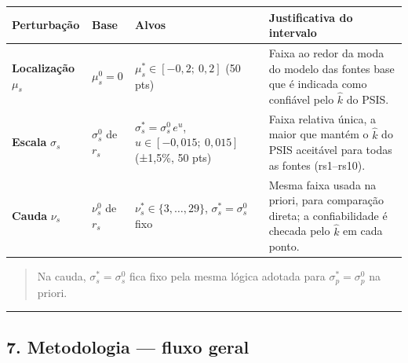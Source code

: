 \documentclass[11pt]{article}
\newcounter{none}
\begin{document}
{\def\LTcaptype{none} %
\begin{longtable}[]{@{}
  >{\raggedright\arraybackslash}p{}
  >{\raggedright\arraybackslash}p{}
  >{\raggedright\arraybackslash}p{}
  >{\raggedright\arraybackslash}p{}@{}}
\toprule\noalign{}
\begin{minipage}[b]{\linewidth}\raggedright
Perturbação
\end{minipage} & \begin{minipage}[b]{\linewidth}\raggedright
Base
\end{minipage} & \begin{minipage}[b]{\linewidth}\raggedright
Alvos
\end{minipage} & \begin{minipage}[b]{\linewidth}\raggedright
Justificativa do intervalo
\end{minipage} \\
\midrule\noalign{}
\endhead
\bottomrule\noalign{}
\endlastfoot
\textbf{Localização} \(\mu_s\) & \(\mu_s^{0} = 0\) &
\(\mu_s^{*} \in [-0{,}2;\ 0{,}2]\) (50 pts) & Faixa ao redor da moda do
modelo das fontes base que é indicada como confiável pelo \(\hat k\) do
PSIS. \\
\textbf{Escala} \(\sigma_s\) & \(\sigma_s^{0}\) de \(r_s\) &
\(\sigma_s^{*}=\sigma_s^{0}\,e^{u}\), \(u\in[-0{,}015;\ 0{,}015]\)
(±1,5\%, 50 pts) & Faixa relativa única, a maior que mantém o \(\hat k\)
do PSIS aceitável para todas as fontes (rs1--rs10). \\
\textbf{Cauda} \(\nu_s\) & \(\nu_s^{0}\) de \(r_s\) &
\(\nu_s^{*} \in \{3,\dots,29\}\), \(\sigma_s^{*}=\sigma_s^{0}\) fixo &
Mesma faixa usada na priori, para comparação direta; a confiabilidade é
checada pelo \(\hat k\) em cada ponto. \\
\end{longtable}
}

\begin{quote}
Na cauda, \(\sigma_s^{*}=\sigma_s^{0}\) fica fixo pela mesma lógica
adotada para \(\sigma_p^{*}=\sigma_p^{0}\) na priori.
\end{quote}

\begin{center}\rule{0.5\linewidth}{0.5pt}\end{center}

\subsection{7. Metodologia --- fluxo
geral}\label{metodologia-fluxo-geral}
\end{document}
